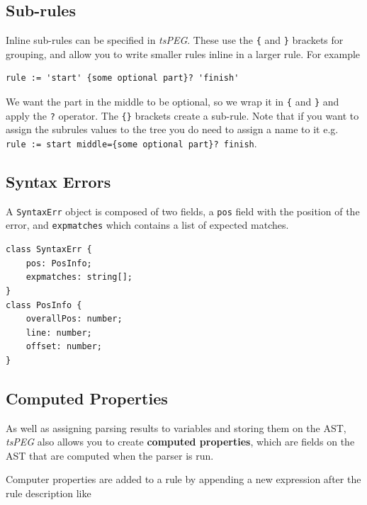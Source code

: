 \subsection{Sub-rules}\label{sub-rules}

Inline sub-rules can be specified in \emph{tsPEG}. These use the
\texttt{\{} and \texttt{\}} brackets for grouping, and allow you to
write smaller rules inline in a larger rule. For example

\begin{verbatim}
rule := 'start' {some optional part}? 'finish'
\end{verbatim}

We want the part in the middle to be optional, so we wrap it in
\texttt{\{} and \texttt{\}} and apply the \texttt{?} operator. The
\texttt{\{\}} brackets create a sub-rule. Note that if you want to
assign the subrules values to the tree you do need to assign a name to
it e.g.
\texttt{rule\ :=\ \textquotesingle{}start\textquotesingle{}\ middle=\{some\ optional\ part\}?\ \textquotesingle{}finish\textquotesingle{}}.

\hypertarget{syntax-errors}{\subsection{Syntax
Errors}\label{syntax-errors}}

A \texttt{SyntaxErr} object is composed of two fields, a \texttt{pos}
field with the position of the error, and \texttt{expmatches} which
contains a list of expected matches.

\begin{verbatim}
class SyntaxErr {
    pos: PosInfo;
    expmatches: string[];
}
class PosInfo {
    overallPos: number;
    line: number;
    offset: number;
}
\end{verbatim}

\hypertarget{computed-properties}{\subsection{Computed
Properties}\label{computed-properties}}

As well as assigning parsing results to variables and storing them on
the AST, \emph{tsPEG} also allows you to create \textbf{computed
properties}, which are fields on the AST that are computed when the
parser is run.

Computer properties are added to a rule by appending a new expression
after the rule description like

